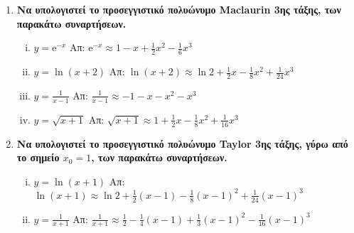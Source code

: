 \documentclass[a4paper,table]{report}
\begin{document}
\begin{center}
  \minibox{\bfseries\large \textcolor{Col1}{Ασκήσεις στις Παραγώγους}}
\end{center}

\vspace{\baselineskip}


\begin{enumerate}
  \item {\bfseries Να υπολογιστεί το προσεγγιστικό πολυώνυμο Maclaurin 3ης τάξης, των 
    παρακάτω συναρτήσεων.}
    \begin{enumerate}[i)]
      \item $ y= \mathrm{e}^{-x} $ 
        \hfill Απ: $ \mathrm{e}^{-x} \approx 1-x+ \frac{1}{2} x^{2} - \frac{1}{6} x^{3} $ 
      \item $ y= \ln{(x+2)} $ 
        \hfill Απ: $ \ln{(x+2)} \approx \ln{2} + \frac{1}{2} x - \frac{1}{8} x^{2} +
        \frac{1}{24} x^{3} $ 
      \item $ y= \frac{1}{x-1} $ \hfill Απ: $ \frac{1}{x-1} \approx -1 -x -x^{2} - x^{3} $ 
      \item $ y= \sqrt{x+1} $ \hfill Απ: $ \sqrt{x+1} \approx 1 + \frac{1}{2} x -
        \frac{1}{8} x^{2} + \frac{1}{16} x^{3} $ 
    \end{enumerate}

  \item {\bfseries Να υπολογιστεί το προσεγγιστικό πολυώνυμο Taylor 3ης τάξης, γύρω από 
      το σημείο $ x_{0}=1 $, των παρακάτω συναρτήσεων.}
    \begin{enumerate}[i)]
      \item $ y= \ln{(x+1)} $ 
        \hfill Απ: $ \ln{(x+1)} \approx \ln{2} + \frac{1}{2} (x-1) - \frac{1}{8}
        (x-1)^{2} + \frac{1}{24} (x-1)^{3} $ 
      \item $ y= \frac{1}{x+1} $ \hfill Απ: $ \frac{1}{x+1} \approx \frac{1}{2} -
        \frac{1}{4} (x-1) + \frac{1}{3} (x-1)^{2} - \frac{1}{16} (x-1)^{3} $ 
    \end{enumerate}
\end{enumerate}
\end{document}
